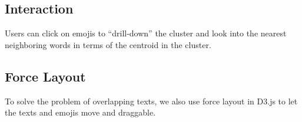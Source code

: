 \subsection{Interaction}
Users can click on emojis to ``drill-down'' \cite{Elmqvist:2010:HAI:1749404.1749525} the cluster and look into the nearest neighboring words in terms of the centroid in the cluster.

\subsection{Force Layout}
To solve the problem of overlapping texts, we also use force layout in D3.js to let the texts and emojis move and draggable. 
